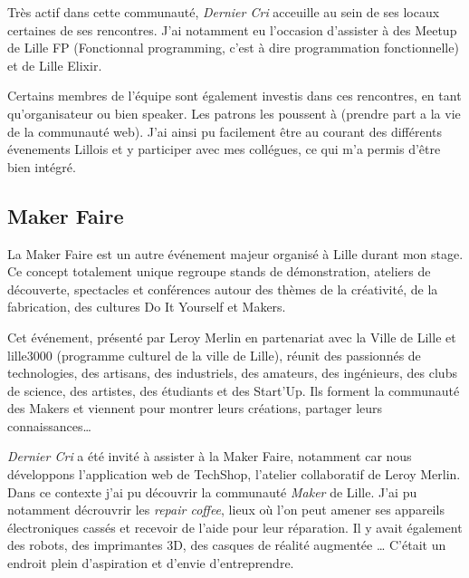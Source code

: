 \documentclass[12pt,a4paper]{article}
\begin{document}
  \bigskip

  Très actif dans cette communauté, \emph{Dernier Cri} acceuille au sein
  de ses locaux certaines de ses rencontres. J'ai notamment eu l'occasion
  d'assister à des Meetup de Lille FP (Fonctionnal programming, c'est à
  dire programmation fonctionnelle) et de Lille Elixir.

  \bigskip

  Certains membres de l'équipe sont également investis dans ces
  rencontres, en tant qu'organisateur ou bien speaker. Les patrons les
  poussent à (prendre part a la vie de la communauté web). J'ai ainsi pu
  facilement être au courant des différents évenements Lillois et y
  participer avec mes collégues, ce qui m'a permis d'être bien intégré.

  \bigskip

  \subsection{Maker Faire}\label{maker-faire}

  \bigskip

  La Maker Faire est un autre événement majeur organisé à Lille durant mon
  stage. Ce concept totalement unique regroupe stands de démonstration,
  ateliers de découverte, spectacles et conférences autour des thèmes de
  la créativité, de la fabrication, des cultures Do It Yourself et Makers.

  \bigskip

  Cet événement, présenté par Leroy Merlin en partenariat avec la Ville de
  Lille et lille3000 (programme culturel de la ville de Lille), réunit des
  passionnés de technologies, des artisans, des industriels, des amateurs,
  des ingénieurs, des clubs de science, des artistes, des étudiants et des
  Start'Up. Ils forment la communauté des Makers et viennent pour montrer
  leurs créations, partager leurs connaissances\ldots{}

  \bigskip

  \emph{Dernier Cri} a été invité à assister à la Maker Faire, notamment
  car nous développons l'application web de TechShop, l'atelier
  collaboratif de Leroy Merlin. Dans ce contexte j'ai pu découvrir la
  communauté \emph{Maker} de Lille. J'ai pu notamment décrouvrir les
  \emph{repair coffee}, lieux où l'on peut amener ses appareils
  électroniques cassés et recevoir de l'aide pour leur réparation. Il y
  avait également des robots, des imprimantes 3D, des casques de réalité
  augmentée \ldots{} C'était un endroit plein d'aspiration et d'envie
  d'entreprendre.
\end{document}

